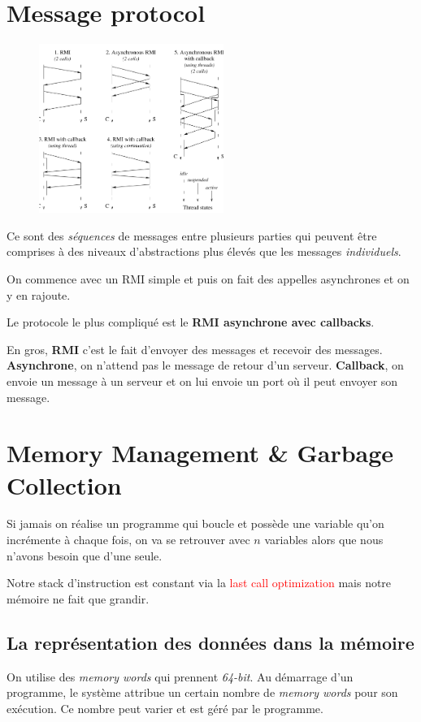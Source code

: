 \documentclass{report}
\begin{document}
\section{Message protocol}
\begin{figure}
\centering
\includegraphics[width=6cm]{img/message.png}
\end{figure}
Ce sont des \textit{séquences} de messages entre plusieurs parties qui peuvent être comprises à des niveaux d'abstractions plus élevés que les messages \textit{individuels}.\par 
On commence avec un RMI simple et puis on fait des appelles asynchrones et on y en rajoute. \par 
Le protocole le plus compliqué est le \textbf{RMI asynchrone avec callbacks}.\par
En gros, \textbf{RMI} c'est le fait d'envoyer des messages et recevoir des messages. \textbf{Asynchrone}, on n'attend pas le message de retour d'un serveur. \textbf{Callback}, on envoie un message à un serveur et on lui envoie un port où il peut envoyer son message.

\section{Memory Management \& Garbage Collection}

Si jamais on réalise un programme qui boucle et possède une variable qu'on incrémente à chaque fois, on va se retrouver avec $n$ variables alors que nous n'avons besoin que d'une seule.\par 
Notre stack d'instruction est constant via la \textcolor{red}{last call optimization} mais notre mémoire ne fait que grandir.

\subsection{La représentation des données dans la mémoire}
On utilise des \textit{memory words} qui prennent \textit{64-bit}. Au démarrage d'un programme, le système attribue un certain nombre de \textit{memory words} pour son exécution. Ce nombre peut varier et est géré par le programme.
\end{document}
